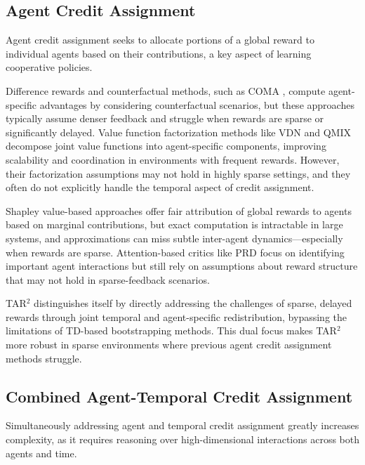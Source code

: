 \subsection{Agent Credit Assignment}
\label{subsec:agent-credit-assignment}

Agent credit assignment seeks to allocate portions of a global reward to individual agents based on their contributions, a key aspect of learning cooperative policies.

Difference rewards and counterfactual methods, such as COMA \citep{foerster2018counterfactual, devlin2014potential}, compute agent-specific advantages by considering counterfactual scenarios, but these approaches typically assume denser feedback and struggle when rewards are sparse or significantly delayed. Value function factorization methods like VDN \citep{sunehag2017value} and QMIX \citep{rashid2020monotonic} decompose joint value functions into agent-specific components, improving scalability and coordination in environments with frequent rewards. However, their factorization assumptions may not hold in highly sparse settings, and they often do not explicitly handle the temporal aspect of credit assignment.

Shapley value-based approaches \citep{wang2020shapley} offer fair attribution of global rewards to agents based on marginal contributions, but exact computation is intractable in large systems, and approximations can miss subtle inter-agent dynamics—especially when rewards are sparse. Attention-based critics like PRD \citep{freed2021learning, kapoor2024assigning, kapoor2024agenttemporalcreditassignmentoptimal} focus on identifying important agent interactions but still rely on assumptions about reward structure that may not hold in sparse-feedback scenarios.

TAR\(^{2}\) distinguishes itself by directly addressing the challenges of sparse, delayed rewards through joint temporal and agent-specific redistribution, bypassing the limitations of TD-based bootstrapping methods. This dual focus makes TAR\(^{2}\) more robust in sparse environments where previous agent credit assignment methods struggle.

\subsection{Combined Agent-Temporal Credit Assignment}
\label{subsec:agent-temporal-credit-assignment}

Simultaneously addressing agent and temporal credit assignment greatly increases complexity, as it requires reasoning over high-dimensional interactions across both agents and time.

